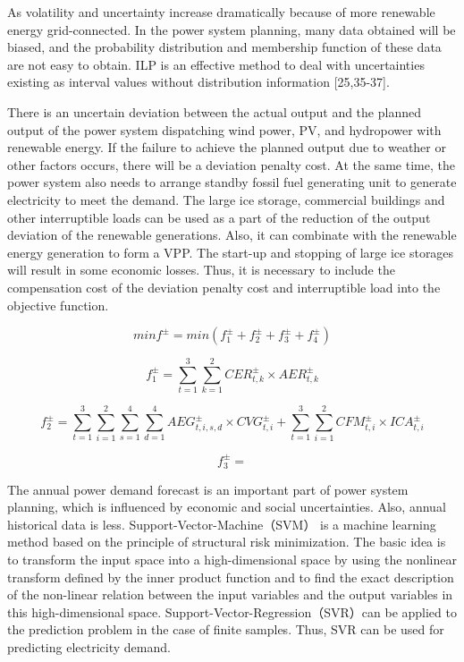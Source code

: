 \documentclass[twocolumn,a4paper]{IEEEtran}
\begin{document}
As volatility and uncertainty increase dramatically because of more renewable energy grid-connected. 
In the power system planning, many data obtained will be biased, and the probability distribution and membership function of these data are not easy to obtain. 
ILP is an effective method to deal with uncertainties existing as interval values without distribution information [25,35-37]. 

There is an uncertain deviation between the actual output and the planned output of the power system dispatching wind power, PV, and hydropower with renewable energy. 
If the failure to achieve the planned output due to weather or other factors occurs, there will be a deviation penalty cost. 
At the same time, the power system also needs to arrange standby fossil fuel generating unit to generate electricity to meet the demand. 
The large ice storage, commercial buildings and other interruptible loads can be used as a part of the reduction of the output deviation of the renewable generations. 
Also, it can combinate with the renewable energy generation to form a VPP. 
The start-up and stopping of large ice storages will result in some economic losses. 
Thus, it is necessary to include the compensation cost of the deviation penalty cost and interruptible load into the objective function.

\begin{equation}
minf^\pm = min(f_1^\pm+f_2^\pm+f_3^\pm+f_4^\pm)
\end{equation}

\begin{equation}
f_1^\pm=\sum_{t=1}^3\sum_{k=1}^2CER_{t,k}^\pm \times AER_{t,k}^\pm
\end{equation}

\begin{equation}
f_2^\pm=\sum_{t=1}^3\sum_{i=1}^2\sum_{s=1}^4\sum_{d=1}^4 AEG_{t,i,s,d}^\pm \times CVG_{t,i}^\pm +\sum_{t=1}^3\sum_{i=1}^2 CFM_{t,i}^\pm \times ICA_{t,i}^\pm
\end{equation}

\begin{equation}
f_3^\pm=
\end{equation}


The annual power demand forecast is an important part of power system planning, which is influenced by economic and social uncertainties. Also, annual historical data is less. Support-Vector-Machine（SVM） is a machine learning method based on the principle of structural risk minimization. The basic idea is to transform the input space into a high-dimensional space by using the nonlinear transform defined by the inner product function and to find the exact description of the non-linear relation between the input variables and the output variables in this high-dimensional space. Support-Vector-Regression（SVR）can be applied to the prediction problem in the case of finite samples. Thus, SVR can be used for predicting electricity demand.
\end{document}
